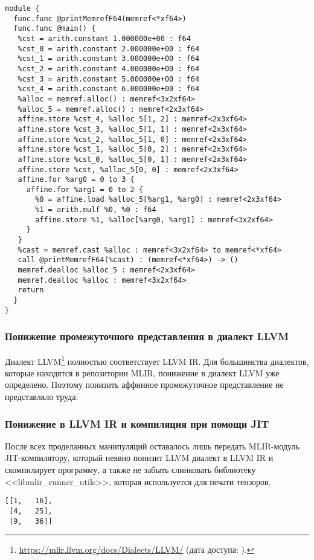 \begin{lstlisting}[caption={Сгенерированное промежуточное представление для программы листинга \ref{toy_ex} после понижения до аффинного промежуточного представления и добавления вышеупомянутых оптимизаций.}, frame=single]
module {
  func.func @printMemrefF64(memref<*xf64>)
  func.func @main() {
   %cst = arith.constant 1.000000e+00 : f64
   %cst_0 = arith.constant 2.000000e+00 : f64
   %cst_1 = arith.constant 3.000000e+00 : f64
   %cst_2 = arith.constant 4.000000e+00 : f64
   %cst_3 = arith.constant 5.000000e+00 : f64
   %cst_4 = arith.constant 6.000000e+00 : f64
   %alloc = memref.alloc() : memref<3x2xf64>
   %alloc_5 = memref.alloc() : memref<2x3xf64>
   affine.store %cst_4, %alloc_5[1, 2] : memref<2x3xf64>
   affine.store %cst_3, %alloc_5[1, 1] : memref<2x3xf64>
   affine.store %cst_2, %alloc_5[1, 0] : memref<2x3xf64>
   affine.store %cst_1, %alloc_5[0, 2] : memref<2x3xf64>
   affine.store %cst_0, %alloc_5[0, 1] : memref<2x3xf64>
   affine.store %cst, %alloc_5[0, 0] : memref<2x3xf64>
   affine.for %arg0 = 0 to 3 {
     affine.for %arg1 = 0 to 2 {
       %0 = affine.load %alloc_5[%arg1, %arg0] : memref<2x3xf64>
       %1 = arith.mulf %0, %0 : f64
       affine.store %1, %alloc[%arg0, %arg1] : memref<3x2xf64>
     }
   }
   %cast = memref.cast %alloc : memref<3x2xf64> to memref<*xf64>
   call @printMemrefF64(%cast) : (memref<*xf64>) -> ()
   memref.dealloc %alloc_5 : memref<2x3xf64>
   memref.dealloc %alloc : memref<3x2xf64>
   return
  }
}
\end{lstlisting}

\subsubsection{Понижение промежуточного представления в диалект LLVM}

Диалект LLVM\footnote{\url{https://mlir.llvm.org/docs/Dialects/LLVM/} (дата доступа:   ).} полностью соответствует LLVM IR. Для большинства диалектов, которые находятся в репозитории MLIR, понижение в диалект LLVM уже определено. Поэтому понизить аффинное промежуточное представление не представляло труда.

\subsubsection{Понижение в LLVM IR и компиляция при помощи JIT}

После всех проделанных манипуляций оставалось лишь передать MLIR-модуль JIT-компилятору, который неявно понизит LLVM диалект в LLVM IR и скомпилирует программу, а также не забыть слинковать библиотеку <<libmlir\_\-run\-ner\_utils>>, которая используется для печати тензоров.

\begin{lstlisting}[caption={Вывод для программы листинга \ref{toy_ex}.}, frame=single]
[[1,   16],
 [4,   25],
 [9,   36]]
\end{lstlisting}

